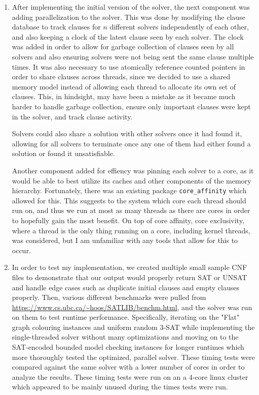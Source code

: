\documentclass[11pt]{extarticle}
\begin{document}
\begin{enumerate}
\item
After implementing the initial version of the solver, the next component was adding
parallelization to the solver. This was done by modifying the clause database to track clauses
for $n$ different solvers independently of each other, and also keeping a clock of the latest
clause seen by each
solver. The clock was added in order to allow for garbage collection of clauses seen by all
solvers and also ensuring solvers were not being sent the same clause multiple times. It was
also necessary to use atomically reference counted pointers in order to share clauses across
threads, since we decided to use a shared memory model instead of allowing each thread to
allocate its own set of clauses. This, in hindsight, may have been a mistake as it became much
harder to handle garbage collection, ensure only important clauses were kept in the solver,
and track clause activity.

Solvers could also share a solution with other solvers once it had found it, allowing for all
solvers to terminate once any one of them had either found a solution or found it unsatisfiable.

Another component added for effiency was pinning each solver to a core, as it would be able to
best utilize its caches and other components of the memory hierarchy.
Fortunately, there was an existing package \texttt{core\_affinity} which allowed for this. This
suggests to the system which core each thread should run on, and thus we run at most as many
threads as there are cores in order to hopefully gain the most benefit. On top of core affinity,
core exclusivity, where a thread is the only thing running on a core, including kernel threads,
was considered, but I am unfamiliar with any tools that allow for this to occur.

\item
In order to test my implementation, we created multiple small sample CNF files to demonstrate
that our output would properly return SAT or UNSAT and handle edge cases such as
duplicate initial clauses and empty clauses properly. Then, various different
benchmarks were pulled from \url{https://www.cs.ubc.ca/~hoos/SATLIB/benchm.html}, and the
solver was run on them to test runtime performance. Specifically, iterating on the "Flat"
graph colouring instances and uniform random 3-SAT while implementing the single-threaded solver
without many optimizations and moving on to the SAT-encoded bounded model checking instances
for longer runtimes which more thoroughly tested the optimized, parallel solver.
These timing tests were compared against the same solver
with a lower number of cores in order to analyze the results. These timing tests were run on an
a 4-core linux cluster which appeared to be mainly unused during the times tests were run.
\end{enumerate}
\end{document}
